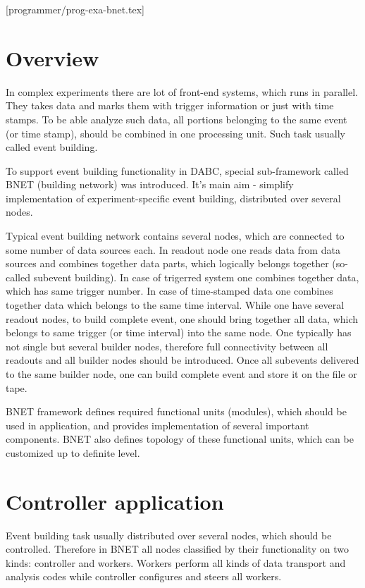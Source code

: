 [programmer/prog-exa-bnet.tex]
\label{prog_exabnet}
\section{Overview}

In complex experiments there are lot of front-end systems, which runs in parallel.
They takes data and marks them with trigger information or just with time stamps.
To be able analyze such data, all portions belonging to the same event (or time stamp),   
should be combined in one processing unit. Such task usually called event building.

To support event building functionality in DABC, special sub-framework called 
BNET (building network) was introduced. 
It's main aim - simplify implementation of experiment-specific event building, 
distributed over several nodes.

Typical event building network contains several  nodes, 
which are connected to some number of data sources each.
In readout node one reads data from data sources and combines
together data parts, which logically belongs together (so-called subevent building).
In case of trigerred system one combines together data, which has same trigger number.
In case of time-stamped data one combines together data which belongs to the same 
time interval. While one have several readout nodes, to build complete event, one
should bring together all data, which belongs to same trigger (or time interval) into
the same  node. 
One typically has not single but several builder nodes, therefore
full connectivity between all readouts and all builder nodes should be introduced.
Once all subevents delivered to the same builder node, one can build complete event 
and store it on the file or tape. 


BNET framework defines required functional units (modules), 
which should be used in application, 
and provides implementation of several important components.
BNET also defines topology of these functional units, which can be customized up
to definite level.


\section{Controller application}

Event building task usually distributed over several nodes, 
which should be controlled.
Therefore in BNET all nodes classified by their functionality on two kinds: controller and
workers. Workers perform all kinds of data transport and analysis codes while controller 
configures and steers all workers. 

